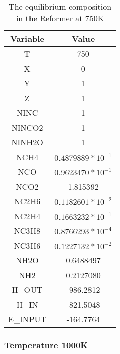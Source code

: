 \documentclass[journal=iecred,manuscript=article]{achemso}
\begin{document}
\FloatBarrier
\begin{table}[H]
\caption{The equilibrium composition in the Reformer at 750K} 
\centering
\begin{tabular}{|c|c|}
\hline\hline %
Variable & Value \\ 
[1ex] %
\hline %
T	& 750 \\
\hline
X	 & 0 \\
\hline
Y	& 1 \\
\hline
Z	& 1 \\
\hline
NINC	& 1 \\
\hline
NINCO2	& 1 \\
\hline
NINH2O	& 1 \\
\hline
NCH4 &	$0.4879889*10^{-1}$ \\
\hline
NCO	& $0.9623470*10^{-1}$ \\
\hline
NCO2	& 1.815392 \\
\hline
NC2H6	& $0.1182601*10^{-2}$ \\
\hline
NC2H4	& $0.1663232*10^{-1}$ \\
\hline
NC3H8	& $0.8766293*10^{-4}$ \\
\hline
NC3H6	& $0.1227132*10^{-2}$ \\
\hline
NH2O	& 0.6488497 \\
\hline
NH2 & 0.2127080 \\
\hline
H_{OUT}	& -986.2812 \\
\hline
H_{IN}	& -821.5048 \\
\hline
E_{INPUT}	& -164.7764 \\
\hline 

\end{tabular}
\end{table}
\FloatBarrier

\subsubsection{Temperature 1000K}
\end{document}
